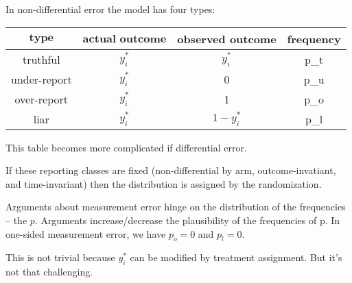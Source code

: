 \documentclass{article}
\begin{document}
In non-differential error the model has four types:
\begin{table}[h]
\begin{tabular}{|c|c|c|c|} \hline
$\textbf{type}$ & $\textbf{actual outcome}$  & \textbf{observed outcome} &  \textbf{frequency}  \\ \hline
truthful     & $y^{*}_i$ & $y^{*}_i$   &  p_t  \\ \hline
under-report & $y^{*}_i$ & 0           &  p_u  \\ \hline
over-report  & $y^{*}_i$ & 1           &  p_o  \\  \hline
liar         & $y^{*}_i$ & $1-y^{*}_i$ &  p_l  \\ \hline
\end{tabular}
\end{table}

This table becomes more complicated if differential error.

If these reporting classes are fixed (non-differential by arm, outcome-invatiant, and time-invariant) then the distribution is assigned by the randomization.

Arguments about measurement error hinge on the distribution of the frequencies -- the $p$. Arguments increase/decrease the plausibility of the frequencies of p. In one-sided measurement error, we have $p_o=0$ and $p_l=0$.

This is not trivial because $y^{*}_i$ can be modified by treatment assignment. But it's not that challenging.
\end{document}
